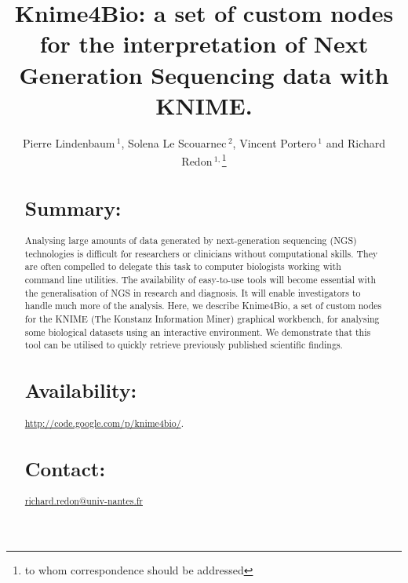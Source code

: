 \documentclass{bioinfo}
\begin{document}

\title[Knime4Bio]{Knime4Bio: a set of custom nodes for the interpretation of Next Generation Sequencing data with KNIME.}
\author[Pierre Lindenbaum \textit{et~al}]{Pierre Lindenbaum\,$^{1}$, Solena Le Scouarnec\,$^{2}$,  Vincent Portero\,$^{1}$ and Richard Redon\,$^{1,}$\footnote{to whom correspondence should be addressed}}
\address{$^{1}$Institut du thorax, Inserm UMR 915, Centre Hospitalier Universitaire de Nantes, 44000 Nantes, France.\\
$^{2}$The Wellcome Trust Sanger Institute, Hinxton, Cambridge CB10 1SA, UK.}



\maketitle

\begin{abstract}

\section{Summary:}
Analysing large amounts of data generated by next-generation sequencing (NGS) technologies is difficult for researchers or clinicians without computational skills. They are often compelled to delegate this task to computer biologists working with command line utilities. The availability of easy-to-use tools will become essential with the generalisation of NGS in research and diagnosis. It will enable investigators to handle much more of the analysis. Here, we describe Knime4Bio, a set of custom nodes for the KNIME (The Konstanz Information Miner) graphical workbench, for analysing some biological datasets using an interactive environment. We demonstrate that this tool can be utilised to quickly retrieve previously published scientific findings.

\section{Availability:}
\href{http://code.google.com/p/knime4bio/}{http://code.google.com/p/knime4bio/}.

\section{Contact:} \href{mailto:richard.redon@univ-nantes.fr}{richard.redon@univ-nantes.fr}
\end{abstract}
\end{document}
